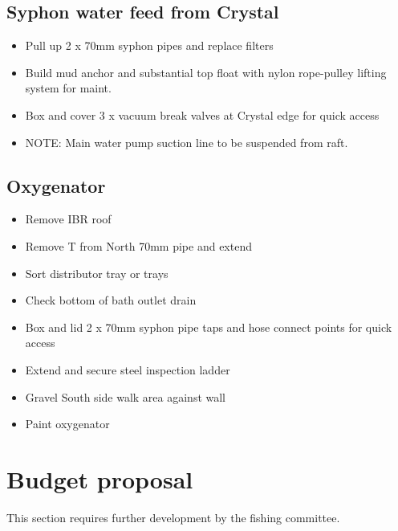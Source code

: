 \subsection{Syphon water feed from Crystal}
\begin{itemize}
\item  Pull up 2 x 70mm syphon pipes and replace filters
\item Build mud anchor and substantial top float with nylon rope-pulley lifting system for maint.
\item Box and cover 3 x vacuum break valves at Crystal edge for quick access
\item NOTE: Main water pump suction line to be suspended from raft.
\end{itemize}


\subsection{Oxygenator}
\begin{itemize}
\item  Remove IBR roof
\item Remove T from North 70mm pipe and extend  
\item Sort distributor tray or trays
\item Check bottom of bath outlet drain
\item Box and lid 2 x 70mm syphon pipe taps and hose connect points for quick access
\item Extend and secure steel inspection ladder
\item Gravel South side walk area against wall
\item Paint oxygenator
\end{itemize}


\section{Budget proposal}

This section requires further development by the fishing committee.

